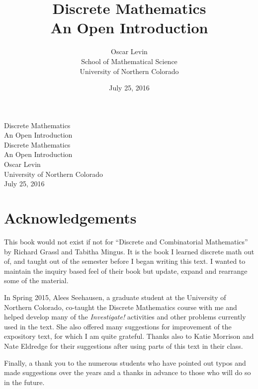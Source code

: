 \documentclass[10pt,]{book}
\title{Discrete Mathematics\\
{\large An Open Introduction}}
\author{Oscar Levin\\
School of Mathematical Science\\
University of Northern Colorado
}
\date{July 25, 2016}
\theoremstyle{plain}
\theoremstyle{definition}
\theoremstyle{definition}
\theoremstyle{definition}
\numberwithin{equation}{section}
\begin{document}
\frontmatter
\thispagestyle{empty}
{\centering
\vspace*{0.28\textheight}
{\Huge Discrete Mathematics}\\[2\baselineskip]
{\LARGE An Open Introduction}\\
}
\clearpage
\thispagestyle{empty}
\null%
\clearpage
\thispagestyle{empty}
{\centering
\vspace*{0.14\textheight}
{\Huge Discrete Mathematics}\\[\baselineskip]
{\LARGE An Open Introduction}\\[3\baselineskip]
{\Large Oscar Levin}\\[0.5\baselineskip]
{\Large University of Northern Colorado}\\[3\baselineskip]
{\Large July 25, 2016}\\}
\clearpage
\thispagestyle{empty}
\null\clearpage
\chapter*{Acknowledgements}\label{acknowledgement-1}

  This book would not exist if not for ``Discrete and Combinatorial Mathematics'' by Richard Grassl and Tabitha Mingus. It is the book I learned discrete math out of, and taught out of the semester before I began writing this text. I wanted to maintain the inquiry based feel of their book but update, expand and rearrange some of the material.
\par

  In Spring 2015, Alees Seehausen, a graduate student at the University of Northern Colorado, co-taught the Discrete Mathematics course with me and helped develop many of the \emph{Investigate!} activities and other problems currently used in the text. She also offered many suggestions for improvement of the expository text, for which I am quite grateful. Thanks also to Katie Morrison and Nate Eldredge for their suggestions after using parts of this text in their class.
\par

  Finally, a thank you to the numerous students who have pointed out typos and made suggestions over the years and a thanks in advance to those who will do so in the future.
\end{document}
